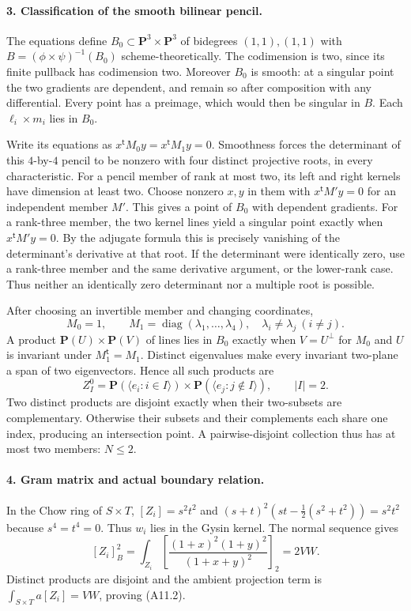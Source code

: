 \documentclass[11pt]{article}
\theoremstyle{remark}\newtheorem{remark}[theorem]{Remark}
\begin{document}
\paragraph{3. Classification of the smooth bilinear pencil.}
The equations define $B_0\subset\mathbf P^3\times\mathbf P^3$
of bidegrees $(1,1),(1,1)$ with
$B=(\phi\times\psi)^{-1}(B_0)$ scheme-theoretically.
The codimension is two, since its finite pullback has codimension
two. Moreover $B_0$ is smooth: at a singular point the two
gradients are dependent, and remain so after composition with
any differential. Every point has a preimage, which would then
be singular in $B$. Each $\ell_i\times m_i$ lies in $B_0$.

Write its equations as $x^{\mathsf t}M_0y=x^{\mathsf t}M_1y=0$.
Smoothness forces the determinant of this $4$-by-$4$ pencil to
be nonzero with four distinct projective roots, in every
characteristic. For a pencil member of rank at most two, its
left and right kernels have dimension at least two. Choose
nonzero $x,y$ in them with $x^{\mathsf t}M'y=0$ for an
independent member $M'$. This gives a point of $B_0$ with
dependent gradients. For a rank-three member, the two kernel
lines yield a singular point exactly when
$x^{\mathsf t}M'y=0$. By the adjugate formula this is precisely
vanishing of the determinant's derivative at that root.
If the determinant were identically zero, use a rank-three
member and the same derivative argument, or the lower-rank
case. Thus neither an identically zero determinant nor a
multiple root is possible.

After choosing an invertible member and changing coordinates,
\[
 M_0=1,\qquad M_1=\operatorname{diag}(\lambda_1,\ldots,\lambda_4),
                      \quad\lambda_i\ne\lambda_j\ (i\ne j).   \tag{A11.5}
\]
A product $\mathbf P(U)\times\mathbf P(V)$ of lines lies in
$B_0$ exactly when $V=U^\perp$ for $M_0$ and $U$ is invariant
under $M_1^{\mathsf t}=M_1$. Distinct eigenvalues make every
invariant two-plane a span of two eigenvectors. Hence all such
products are
\[
 Z_I^0=\mathbf P(\langle e_i:i\in I\rangle)
          \times\mathbf P(\langle e_j:j\notin I\rangle),
                        \qquad |I|=2.                        \tag{A11.6}
\]
Two distinct products are disjoint exactly when their two-subsets
are complementary. Otherwise their subsets and their complements
each share one index, producing an intersection point.
A pairwise-disjoint collection thus has at most two members:
$N\le2$.

\paragraph{4. Gram matrix and actual boundary relation.}
In the Chow ring of $S\times T$, $[Z_i]=s^2t^2$ and
$(s+t)^2(st-\tfrac12(s^2+t^2))=s^2t^2$ because $s^4=t^4=0$.
Thus $w_i$ lies in the Gysin kernel. The normal sequence gives
\[
 [Z_i]_B^2=\int_{Z_i}
       \left[\frac{(1+x)^2(1+y)^2}{(1+x+y)^2}\right]_2=2VW.
\]
Distinct products are disjoint and the ambient projection term
is $\int_{S\times T}a[Z_i]=VW$, proving (A11.2).
\end{document}
